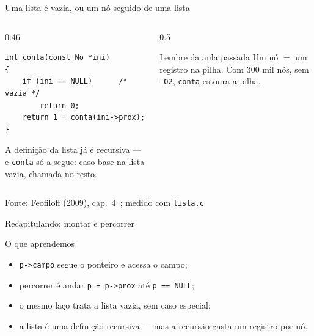 \documentclass[aspectratio=169]{beamer}
\newcommand{\ptr}[1]{($(#1.one split north)!0.5!(#1.south east)$)}
\newcommand{\fonte}[1]{\vfill\hfill{\scriptsize\textcolor{UFSGray}{Fonte: #1}}}
\begin{document}
\begin{frame}[fragile]{Uma lista é vazia, ou um nó seguido de uma lista}
  \begin{columns}[c]
    \begin{column}{0.46\textwidth}
\begin{lstlisting}[style=tinyC]
int conta(const No *ini)
{
    if (ini == NULL)      /* vazia */
        return 0;
    return 1 + conta(ini->prox);
}
\end{lstlisting}
      \small A definição da lista já é recursiva --- e
      \texttt{conta} só a segue: caso base na lista vazia, chamada no
      resto.
    \end{column}
    \begin{column}{0.5\textwidth}
      \begin{center}
      \end{center}
      \begin{alertblock}{Lembre da aula passada}
        \small Um nó $=$ um registro na pilha. Com 300 mil nós, sem
        \texttt{-O2}, \texttt{conta} estoura a pilha.
      \end{alertblock}
    \end{column}
  \end{columns}
  \fonte{Feofiloff (2009), cap.~4~\cite{feofiloff2009algoritmos};
    medido com \texttt{lista.c}}
\end{frame}

\begin{frame}{Recapitulando: montar e percorrer}
  \begin{block}{O que aprendemos}
    \begin{itemize}
      \item \texttt{p->campo} segue o ponteiro e acessa o campo;
      \item percorrer é andar \texttt{p = p->prox} até \texttt{p == NULL};
      \item o mesmo laço trata a lista vazia, sem caso especial;
      \item a lista é uma definição recursiva --- mas a recursão gasta um
        registro por nó.
    \end{itemize}
  \end{block}
\end{frame}
\end{document}
